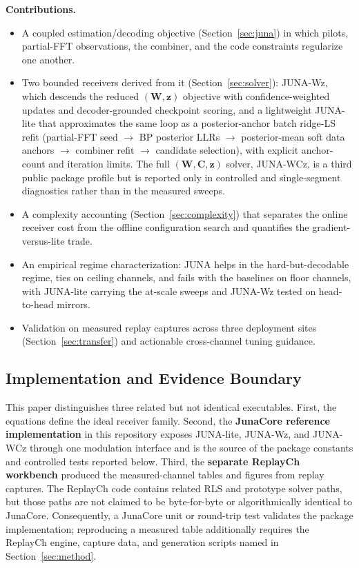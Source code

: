 \documentclass[journal]{IEEEtran}
\newcommand{\juna}{JUNA}
\newcommand{\junalite}{JUNA-lite}
\newcommand{\junawz}{JUNA-Wz}
\newcommand{\junawcz}{JUNA-WCz}
\begin{document}
\textbf{Contributions.}
\begin{itemize}
\item A coupled estimation/decoding objective (Section~\ref{sec:juna}) in which
  pilots, partial-FFT observations, the combiner, and the code constraints regularize
  one another.
\item Two bounded receivers derived from it (Section~\ref{sec:solver}):
  \junawz{}, which descends the reduced $(\mathbf W,\mathbf z)$ objective with
  confidence-weighted updates and decoder-grounded checkpoint scoring, and a
  lightweight \junalite{} that approximates the same loop as a
  posterior-anchor batch ridge-LS refit
  (partial-FFT seed $\to$ BP posterior LLRs $\to$ posterior-mean soft data
  anchors $\to$ combiner refit $\to$ candidate selection), with explicit
  anchor-count and iteration limits. The full $(\mathbf W,\mathbf C,\mathbf z)$
  solver, \junawcz{}, is a third public package profile but is reported only in
  controlled and single-segment diagnostics rather than in the measured sweeps.
\item A complexity accounting (Section~\ref{sec:complexity}) that separates the
  online receiver cost from the offline configuration search and quantifies the
  gradient-versus-lite trade.
\item An empirical regime characterization: \juna{} helps in the
  hard-but-decodable regime, ties on ceiling channels, and fails with the
  baselines on floor channels, with \junalite{} carrying the at-scale sweeps and
  \junawz{} tested on head-to-head mirrors.
\item Validation on measured replay captures across three deployment sites
  (Section~\ref{sec:transfer}) and actionable cross-channel tuning guidance.
\end{itemize}

\subsection{Implementation and Evidence Boundary}
This paper distinguishes three related but not identical executables. First,
the equations define the ideal receiver family. Second, the \textbf{JunaCore
reference implementation} in this repository exposes \junalite{}, \junawz{},
and \junawcz{} through one modulation interface and is the source of the
package constants and controlled tests reported below. Third, the
\textbf{separate ReplayCh workbench} produced the measured-channel tables and
figures from replay captures. The ReplayCh code contains related RLS and
prototype solver paths, but those paths are not claimed to be byte-for-byte or
algorithmically identical to JunaCore. Consequently, a JunaCore unit or
round-trip test validates the package implementation; reproducing a measured
table additionally requires the ReplayCh engine, capture data, and generation
scripts named in Section~\ref{sec:method}.
\end{document}
